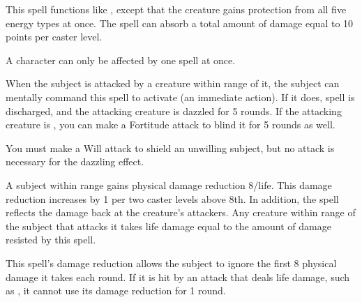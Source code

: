 \begin{spelleffect}
  This spell functions like , except that the creature gains protection from all five energy types at once. The spell can absorb a total amount of damage equal to 10 points per caster level.
\end{spelleffect}
\begin{spellnotes}
  A character can only be affected by one  spell at once.
\end{spellnotes}

\begin{spelleffect}
    When the subject is attacked by a creature within \rngclose range of it, the subject can mentally command this spell to activate (an immediate action). If it does, spell is discharged, and the attacking creature is dazzled for 5 rounds. If the attacking creature is \bloodied, you can make a Fortitude attack to blind it for 5 rounds as well.
\end{spelleffect}
\begin{spellnotes}
    You must make a Will attack to shield an unwilling subject, but no attack is necessary for the dazzling effect.
\end{spellnotes}

\spellrng{\rngclose/\rngmed}
\spelldur{\durshort}
\begin{spelleffect}
  A subject within \rngclose range gains physical damage reduction 8/life. This damage reduction increases by 1 per two caster levels above 8th. In addition, the spell reflects the damage back at the creature's attackers. Any creature within \rngmed range of the subject that attacks it takes life damage equal to the amount of damage resisted by this spell.
\end{spelleffect}
\begin{spellnotes}
  This spell's damage reduction allows the subject to ignore the first 8 physical damage it takes each round. If it is hit by an attack that deals life damage, such as , it cannot use its damage reduction for 1 round.
\end{spellnotes}

